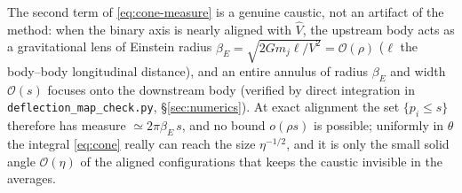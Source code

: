 \documentclass[11pt]{article}
\newcommand{\Vh}{\hat V}
\newcommand{\order}[1]{\mathcal O\!\left(#1\right)}
\begin{document}
The second term of \eqref{eq:cone-measure} is a genuine caustic, not an artifact of the method:
when the binary axis is nearly aligned with $\Vh$, the upstream body acts as a gravitational lens
of Einstein radius $\beta_E=\sqrt{2Gm_j\ell/V^2}=\order\rho$ ($\ell$ the body--body longitudinal
distance), and an entire annulus of radius $\beta_E$ and width $\order s$ focuses onto the
downstream body (verified by direct integration in \texttt{deflection\_map\_check.py},
\S\ref{sec:numerics}). At exact alignment the set $\{p_i\le s\}$ therefore has measure
$\simeq2\pi\beta_E\,s$, and no bound $o(\rho s)$ is possible; uniformly in $\theta$ the integral
\eqref{eq:cone} really can reach the size $\eta^{-1/2}$, and it is only the small solid angle
$\order\eta$ of the aligned configurations that keeps the caustic invisible in the averages.
\end{document}
